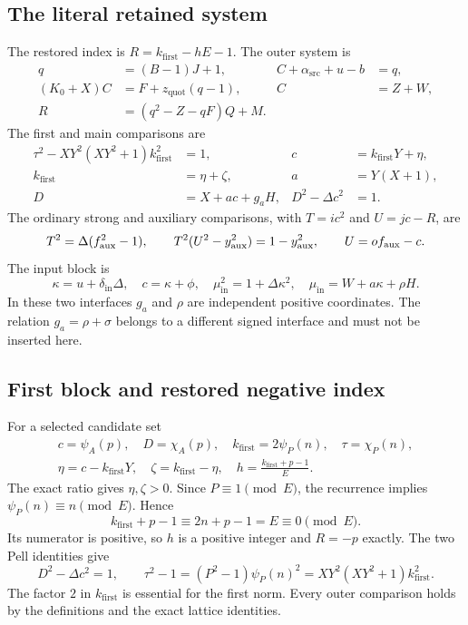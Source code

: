 \documentclass[11pt,letterpaper]{article}
\theoremstyle{definition}\newtheorem{definition}[theorem]{Definition}
\theoremstyle{remark}\newtheorem{remark}[theorem]{Remark}
\newcommand{\zquot}{z_{\mathrm{quot}}}\newcommand{\ga}{g_a}
\newcommand{\faux}{f_{\mathrm{aux}}}\newcommand{\rmain}{r_{\mathrm{main}}}\newcommand{\acent}{\mathcal F}
\begin{document}
\subsection{The literal retained system}
The restored index is $R=k_{\mathrm{first}}-hE-1$. The outer system is
\begin{align}\label{fup:nr:eq:literalouter}
 q&=(B-1)J+1,& C+\alpha_{\mathrm{src}}+u-b&=q,\\
 (K_0+X)C&=F+\zquot(q-1),& C&=Z+W,\nonumber\\
 R&=(q^2-Z-qF)Q+M.&&\nonumber
\end{align}
The first and main comparisons are
\begin{align}\label{fup:nr:eq:literalfirst}
 \tau^2-XY^2(XY^2+1)k_{\mathrm{first}}^2&=1,&
 c&=k_{\mathrm{first}}Y+\eta,\\
 k_{\mathrm{first}}&=\eta+\zeta,& a&=Y(X+1),\nonumber\\
 D&=X+ac+\ga H,&D^2-\Delta c^2&=1.\nonumber
\end{align}
The ordinary strong and auxiliary comparisons, with $T=ic^2$ and $U=jc-R$, are
\begin{equation}\label{fup:nr:eq:literalaux}
 T^2=\Delta(\faux^2-1),\qquad
 T^2(U^2-\yaux^2)=1-\yaux^2,\qquad U=o\faux-c.
\end{equation}
The input block is
\begin{equation}\label{fup:nr:eq:literalinput}
 \kappa=u+\delta_{\mathrm{in}}\Delta,\quad c=\kappa+\phi,\quad
 \mu_{\mathrm{in}}^2=1+\Delta\kappa^2,\quad
 \mu_{\mathrm{in}}=W+a\kappa+\rho H.
\end{equation}
In these two interfaces $\ga$ and $\rho$ are independent positive coordinates. The relation $\ga=\rho+\sigma$ belongs to a different signed interface and must not be inserted here.

\subsection{First block and restored negative index}
For a selected candidate set
\begin{equation}\label{fup:nr:eq:firstwitness}
 \begin{gathered}
 c=\psi_A(p),\quad D=\chi_A(p),\quad
 k_{\mathrm{first}}=2\psi_P(n),\quad\tau=\chi_P(n),\\
 \eta=c-k_{\mathrm{first}}Y,\quad
 \zeta=k_{\mathrm{first}}-\eta,\quad
 h=\frac{k_{\mathrm{first}}+p-1}{E}.
 \end{gathered}
\end{equation}
The exact ratio gives $\eta,\zeta>0$. Since $P\equiv1\pmod E$, the recurrence implies $\psi_P(n)\equiv n\pmod E$. Hence
\[
 k_{\mathrm{first}}+p-1\equiv2n+p-1=E\equiv0\pmod E.
\]
Its numerator is positive, so $h$ is a positive integer and $R=-p$ exactly. The two Pell identities give
\[
 D^2-\Delta c^2=1,\qquad
 \tau^2-1=(P^2-1)\psi_P(n)^2
          =XY^2(XY^2+1)k_{\mathrm{first}}^2.
\]
The factor $2$ in $k_{\mathrm{first}}$ is essential for the first norm. Every outer comparison holds by the definitions and the exact lattice identities.
\end{document}
